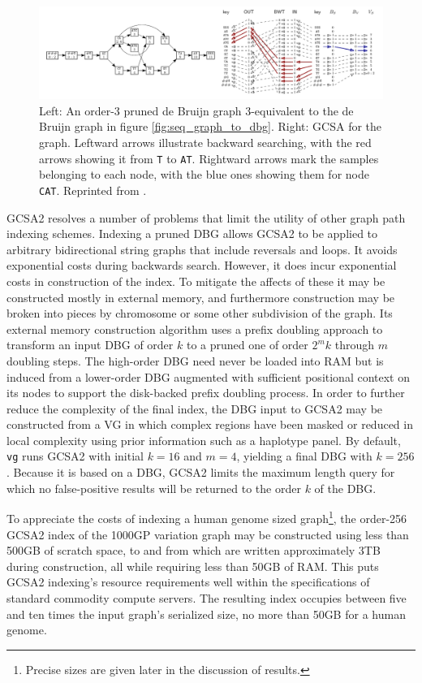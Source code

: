\begin{figure}[htbp!]
  \includegraphics[width=\textwidth]{Chapter2/Figs/DBG_to_GCSA.pdf}
  \caption[Searching in the {\tt GCSA2}]{
    Left: An order-3 pruned de Bruijn graph 3-equivalent to the de Bruijn graph in figure \ref{fig:seq_graph_to_dbg}.
    Right: GCSA for the graph.
    Leftward arrows illustrate backward searching, with the red arrows showing it from {\tt T} to {\tt AT}.
    Rightward arrows mark the samples belonging to each node, with the blue ones showing them for node {\tt CAT}.
    Reprinted from \cite{siren2017indexing}.
  }
  \label{fig:gcsa2_search}
\end{figure}

GCSA2 resolves a number of problems that limit the utility of other graph path indexing schemes.
Indexing a pruned DBG allows GCSA2 to be applied to arbitrary bidirectional string graphs that include reversals and loops.
It avoids exponential costs during backwards search.
However, it does incur exponential costs in construction of the index.
To mitigate the affects of these it may be constructed mostly in external memory, and furthermore construction may be broken into pieces by chromosome or some other subdivision of the graph.
Its external memory construction algorithm uses a prefix doubling approach to transform an input DBG of order $k$ to a pruned one of order $2^mk$ through $m$ doubling steps.
The high-order DBG need never be loaded into RAM but is induced from a lower-order DBG augmented with sufficient positional context on its nodes to support the disk-backed prefix doubling process.
In order to further reduce the complexity of the final index, the DBG input to GCSA2 may be constructed from a VG in which complex regions have been masked or reduced in local complexity using prior information such as a haplotype panel.
By default, {\tt vg} runs GCSA2 with initial $k=16$ and $m=4$, yielding a final DBG with $k=256$.
Because it is based on a DBG, GCSA2 limits the maximum length query for which no false-positive results will be returned to the order $k$ of the DBG.

To appreciate the costs of indexing a human genome sized graph\footnote{Precise sizes are given later in the discussion of results.}, the order-256 GCSA2 index of the 1000GP variation graph may be constructed using less than 500GB of scratch space, to and from which are written approximately 3TB during construction, all while requiring less than 50GB of RAM.
This puts GCSA2 indexing's resource requirements well within the specifications of standard commodity compute servers.
The resulting index occupies between five and ten times the input graph's serialized size, no more than 50GB for a human genome.

